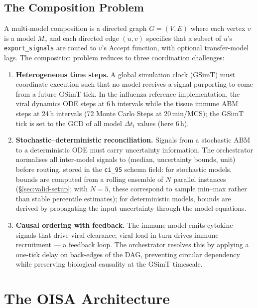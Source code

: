 \documentclass[conference,letterpaper,10pt]{IEEEtran}
\begin{document}
\subsection{The Composition Problem}\label{sec:composition}
A multi-model composition is a directed graph $G\!=\!(V,E)$ where each
vertex $v$ is a model $M_v$ and each directed edge $(u,v)$ specifies
that a subset of $u$'s \texttt{export\_signals} are routed to $v$'s
Accept function, with optional transfer-model lags. The composition
problem reduces to three coordination challenges:

\begin{enumerate}
\item \textbf{Heterogeneous time steps.} A global simulation clock
      (GSimT) must coordinate execution such that no model receives a
      signal purporting to come from a future GSimT tick. In the
      influenza reference implementation, the viral dynamics ODE steps
      at 6\,h intervals while the tissue immune ABM steps at 24\,h
      intervals (72 Monte Carlo Steps at 20\,min/MCS); the GSimT tick
      is set to the GCD of all model $\Delta t_i$ values (here 6\,h).

\item \textbf{Stochastic--deterministic reconciliation.} Signals from a
      stochastic ABM to a deterministic ODE must carry uncertainty
      information. The orchestrator normalises all inter-model signals
      to (median, uncertainty bounds, unit) before routing, stored in
      the \texttt{ci\_95} schema field: for stochastic models, bounds
      are computed from a rolling ensemble of $N$ parallel instances
      (\S\ref{sec:valid-setup}; with $N\!=\!5$, these correspond to
      sample min--max rather than stable percentile estimates); for
      deterministic models, bounds are derived by propagating the input
      uncertainty through the model equations.

\item \textbf{Causal ordering with feedback.} The immune model emits
      cytokine signals that drive viral clearance; viral load in turn
      drives immune recruitment --- a feedback loop. The orchestrator
      resolves this by applying a one-tick delay on back-edges of the
      DAG, preventing circular dependency while preserving biological
      causality at the GSimT timescale.
\end{enumerate}

\section{The OISA Architecture}
\end{document}
